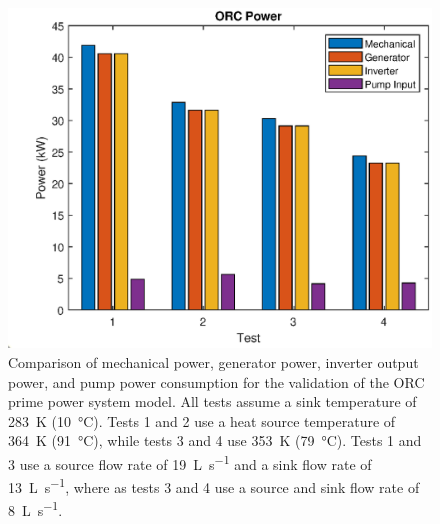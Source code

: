 \begin{figure}[p]
	\centering
	
	\includegraphics[width=\textwidth]{figures/VerificationPower01}
	
	\caption{Comparison of mechanical power, generator power, inverter output power, and pump power consumption for the validation of the ORC prime power system model. All tests assume a sink temperature of \SI{283}{\kelvin} (\SI{10}{\degreeCelsius}). Tests 1 and 2 use a heat source temperature of \SI{364}{\kelvin} (\SI{91}{\degreeCelsius}), while tests 3 and 4 use \SI{353}{\kelvin} (\SI{79}{\degreeCelsius}). Tests 1 and 3 use a source flow rate of \SI{19}{\liter\per\second} and a sink flow rate of \SI{13}{\liter\per\second}, where as tests 3 and 4 use a source and sink flow rate of \SI{8}{\liter\per\second}.
	}
	\label{fig:verificationPower01}
\end{figure}